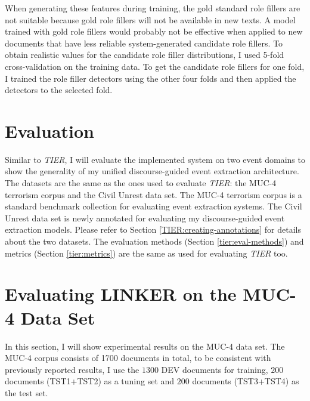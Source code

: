 When generating these features during training,
the gold standard role fillers are not suitable 
because gold role fillers will not be available in new texts. A model
trained with gold role 
fillers would probably not be effective when applied to new documents
that have less reliable system-generated candidate role fillers. 
To obtain realistic values for the candidate role filler
distributions, I used 5-fold cross-validation on the training data.
To get the candidate role fillers for one fold, I trained the
role filler detectors using the other four folds and then
applied the detectors to the selected fold.

\section{Evaluation}
\label{eval-section}
Similar to {\it TIER}, I will evaluate the implemented system 
on two event domains to show the generality of my unified 
discourse-guided event extraction architecture. 
The datasets are the same as the ones used to evaluate {\it TIER}:  
the MUC-4 terrorism corpus and the Civil Unrest data set. 
The MUC-4 terrorism corpus
\cite{muc4-proceedings} is 
a standard benchmark collection 
for evaluating event extraction systems. 
The Civil Unrest data set is newly annotated for evaluating my 
discourse-guided event extraction models. 
Please refer to Section \ref{TIER:creating-annotations} for 
details about the two datasets.
The evaluation methods (Section \ref{tier:eval-methods}) 
and metrics (Section \ref{tier:metrics}) are the same as used for 
evaluating {\it TIER} too. 



 \section{Evaluating LINKER on the MUC-4 Data Set}
 \label{chap4:linker-muc}
In this section, I will show experimental results 
on the MUC-4 data set.
The MUC-4 corpus consists of 1700 documents in total, 
to be consistent with
previously reported results, 
I use the $1300$ DEV
documents for training, $200$ documents (TST1+TST2) as a tuning set
and $200$ documents (TST3+TST4) as the test set.

